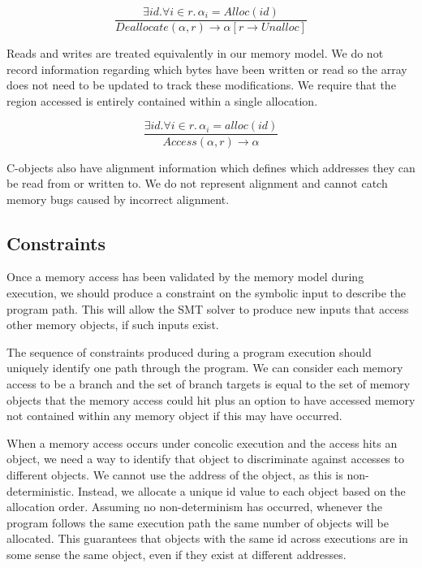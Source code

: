 \documentclass[12pt,twoside]{report}
\begin{document}

$$\frac{\exists id. \forall i \in r. \, \alpha_i = Alloc(id)}{Deallocate(\alpha, r) \rightarrow \alpha[r \rightarrow Unalloc]}$$

Reads and writes are treated equivalently in our memory model. We do not record information regarding which bytes have been written or read so the array does not need to be updated to track these modifications. We require that the region accessed is entirely contained within a single allocation. 

$$\frac{\exists id. \forall i \in r. \, \alpha_i = alloc(id)}{Access(\alpha, r) \rightarrow \alpha}$$

C-objects also have alignment information which defines which addresses they can be read from or written to. We do not represent alignment and cannot catch memory bugs caused by incorrect alignment.

\subsection{Constraints}
Once a memory access has been validated by the memory model during execution, we should produce a constraint on the symbolic input to describe the program path. This will allow the SMT solver to produce new inputs that access other memory objects, if such inputs exist.

The sequence of constraints produced during a program execution should uniquely identify one path through the program. We can consider each memory access to be a branch and the set of branch targets is equal to the set of memory objects that the memory access could hit plus an option to have accessed memory not contained within any memory object if this may have occurred.

When a memory access occurs under concolic execution and the access hits an object, we need a way to identify that object to discriminate against accesses to different objects. We cannot use the address of the object, as this is non-deterministic. Instead, we allocate a unique id value to each object based on the allocation order. Assuming no non-determinism has occurred, whenever the program follows the same execution path the same number of objects will be allocated. This guarantees that objects with the same id across executions are in some sense the same object, even if they exist at different addresses.
\end{document}
